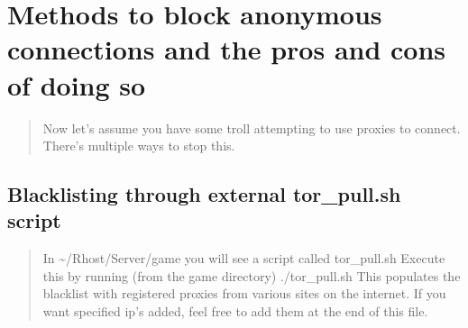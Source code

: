 \documentclass[letterpaper,10pt,english]{sphinxmanual}
\begin{document}
\begin{sphinxVerbatim}[commandchars=\\\{\}]
           
         
             
           
          
            
          
          
\end{sphinxVerbatim}


\section{Methods to block anonymous connections and the pros and cons of doing so}
\label{\detokenize{security:methods-to-block-anonymous-connections-and-the-pros-and-cons-of-doing-so}}\begin{quote}

\sphinxAtStartPar
Now let’s assume you have some troll attempting to use proxies to connect.
There’s multiple ways to stop this.
\end{quote}


\subsection{Blacklisting through external tor\_pull.sh script}
\label{\detokenize{security:blacklisting-through-external-tor-pull-sh-script}}\begin{quote}

\sphinxAtStartPar
In \textasciitilde{}/Rhost/Server/game you will see a script called tor\_pull.sh
Execute this by running (from the game directory) ./tor\_pull.sh
This populates the blacklist with registered proxies from various sites
on the internet.  If you want specified ip’s added, feel free to add
them at the end of this file.
\end{quote}
\end{document}
